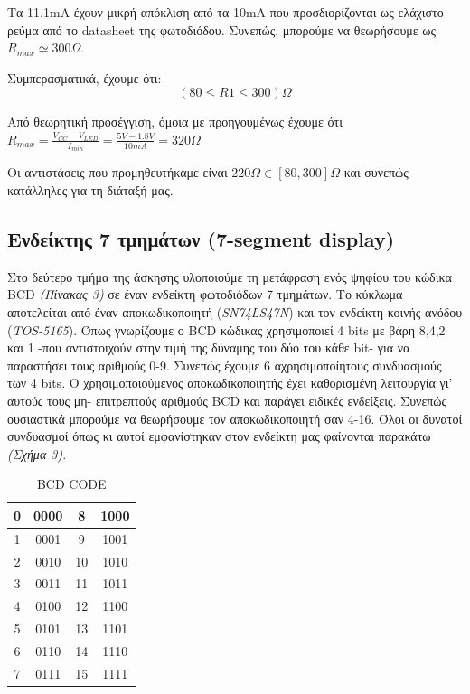 \documentclass[a4paper,10pt]{article} \usepackage{anysize}
\begin{document}
Τα 11.1mA έχουν μικρή απόκλιση από τα 10mA που προσδιορίζονται  ως ελάχιστο
ρεύμα από το datasheet της φωτοδιόδου. Συνεπώς, μπορούμε να θεωρήσουμε ως
\begin{math} R_{max}\simeq300\Omega\end{math}.


Συμπερασματικά, έχουμε ότι:\[ (80\leq R1\leq 300)\Omega \]

Από θεωρητική προσέγγιση, όμοια με προηγουμένως έχουμε ότι \begin{math}
R_{max}=\frac{V_{CC} - V_{LED}}{I_{min}} = \frac{5V-1.8V}{10mA}
=320\Omega\end{math}


Οι αντιστάσεις που προμηθευτήκαμε είναι \begin{math} 220 \Omega \in
[80,300]\Omega \end{math} και συνεπώς κατάλληλες για τη διάταξή μας.


\subsection{Ενδείκτης 7 τμημάτων (7-segment display)} Στο δεύτερο τμήμα της
άσκησης υλοποιούμε τη μετάφραση ενός ψηφίου του κώδικα BCD \textit{(Πίνακας
3)} σε έναν ενδείκτη φωτοδιόδων 7 τμημάτων. Το κύκλωμα αποτελείται από έναν
αποκωδικοποιητή (\textit{SN74LS47N}) και τον ενδείκτη  κοινής ανόδου
(\textit{TOS-5165}). Όπως γνωρίζουμε ο BCD κώδικας χρησιμοποιεί 4 bits με βάρη
8,4,2 και 1 -που αντιστοιχούν στην τιμή της δύναμης του δύο του κάθε bit- για
να παραστήσει τους αριθμούς 0-9. Συνεπώς έχουμε 6 αχρησιμοποίητους συνδυασμούς
των 4 bits. Ο χρησιμοποιούμενος αποκωδικοποιητής έχει καθορισμένη λειτουργία
γι' αυτούς τους μη- επιτρεπτούς αριθμούς BCD και παράγει ειδικές ενδείξεις.
Συνεπώς ουσιαστικά μπορούμε να θεωρήσουμε τον αποκωδικοποιητή σαν 4-16. Όλοι
οι δυνατοί συνδυασμοί όπως κι αυτοί εμφανίστηκαν στον ενδείκτη μας φαίνονται
παρακάτω \textit{(Σχήμα 3)}.

\begin{table}[H] 
\caption{BCD CODE} 
\begin{center} 
\begin{tabular}{|c|c||c|c|}
\hline 0&0000&8&1000\\ 
\hline 1&0001&9&1001\\ 
\hline 2&0010&10&1010\\ 
\hline 3&0011&11&1011\\ 
\hline 4&0100&12&1100\\ 
\hline 5&0101&13&1101\\ 
\hline 6&0110&14&1110\\ 
\hline 7&0111&15&1111\\ 
\hline 
\end{tabular} 
\end{center}
\end{table}
\end{document}
